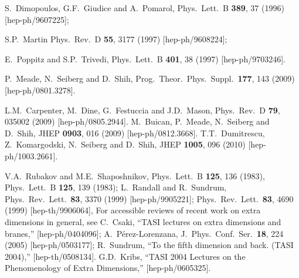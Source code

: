 \documentclass[11pt]{article}
\begin{document}
\begin{thebibliography}{999}
S.~Dimopoulos, G.F.~Giudice and A.~Pomarol, 
  Phys.\ Lett.\ B {\bf 389}, 37 (1996)
  [hep-ph/9607225];

S.P.~Martin 
  Phys.\ Rev.\ D {\bf 55}, 3177 (1997)
  [hep-ph/9608224];

E.~Poppitz and S.P.~Trivedi, 
  Phys.\ Lett.\ B {\bf 401}, 38 (1997)
  [hep-ph/9703246].

P.~Meade, N.~Seiberg and D.~Shih,
  Prog.\ Theor.\ Phys.\ Suppl.\  {\bf 177}, 143 (2009)
  [hep-ph/0801.3278].

L.M.~Carpenter, M.~Dine, G.~Festuccia and J.D.~Mason,
  Phys.\ Rev.\  D {\bf 79}, 035002 (2009)
  [hep-ph/0805.2944].
M.~Buican, P.~Meade, N.~Seiberg and D.~Shih,
  JHEP {\bf 0903}, 016 (2009)
  [hep-ph/0812.3668].
T.T.~Dumitrescu, Z.~Komargodski, N.~Seiberg and D.~Shih,
  JHEP {\bf 1005}, 096 (2010)
  [hep-ph/1003.2661].

V.A.~Rubakov and M.E.~Shaposhnikov,
  Phys.\ Lett.\ B {\bf 125}, 136 (1983),
  Phys.\ Lett.\ B {\bf 125}, 139 (1983);
L.~Randall and R.~Sundrum,
  Phys.\ Rev.\ Lett.\  {\bf 83}, 3370 (1999)
  [hep-ph/9905221];
  Phys.\ Rev.\ Lett.\  {\bf 83}, 4690 (1999)
  [hep-th/9906064],
For accessible reviews of recent work on extra dimensions in general, see 
C.~Csaki,
  ``TASI lectures on extra dimensions and branes,''
  [hep-ph/0404096];
A.~P\'erez-Lorenzana,
  J.\ Phys.\ Conf.\ Ser.\  {\bf 18}, 224 (2005)
  [hep-ph/0503177];
R.~Sundrum,
  ``To the fifth dimension and back. (TASI 2004),''
  [hep-th/0508134].
G.D.~Kribs,
  ``TASI 2004 Lectures on the Phenomenology of Extra Dimensions,''
  [hep-ph/0605325].
  

\end{thebibliography}
\end{document}
